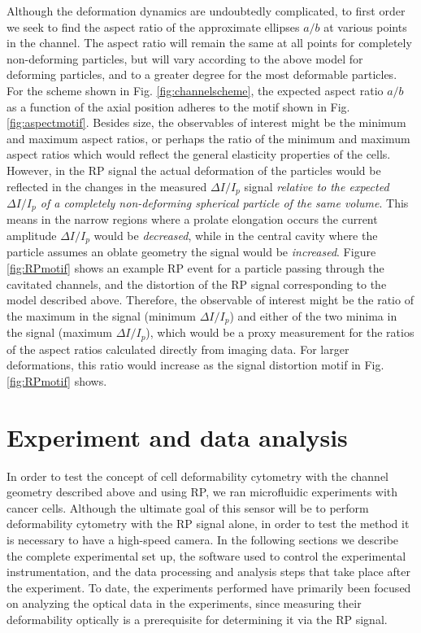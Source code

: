 		Although the deformation dynamics are undoubtedly complicated, to first order we seek to find the aspect ratio of the approximate ellipses $a/b$ at various points in the channel. The aspect ratio will remain the same at all points for completely non-deforming particles, but will vary according to the above model for deforming particles, and to a greater degree for the most deformable particles. For the scheme shown in Fig. \ref{fig:channelscheme}, the expected aspect ratio $a/b$ as a function of the axial position adheres to the motif shown in Fig. \ref{fig:aspectmotif}. Besides size, the observables of interest might be the minimum and maximum aspect ratios, or perhaps the ratio of the minimum and maximum aspect ratios which would reflect the general elasticity properties of the cells. However, in the RP signal the actual deformation of the particles would be reflected in the changes in the measured $\Delta I/I_{p}$ signal \textit{relative to the expected $\Delta I/I_{p}$ of a completely non-deforming spherical particle of the same volume}. This means in the narrow regions where a prolate elongation occurs the current amplitude $\Delta I/I_{p}$ would be \textit{decreased}, while in the central cavity where the particle assumes an oblate geometry the signal would be \textit{increased}. Figure \ref{fig:RPmotif} shows an example RP event for a particle passing through the cavitated channels, and the distortion of the RP signal corresponding to the model described above. Therefore, the observable of interest might be the ratio of the maximum in the signal (minimum $\Delta I/I_{p}$) and either of the two minima in the signal (maximum $\Delta I/I_{p}$), which would be a proxy measurement for the ratios of the aspect ratios calculated directly from imaging data. For larger deformations, this ratio would increase as the signal distortion motif in Fig. \ref{fig:RPmotif} shows.
		
	\section{Experiment and data analysis}

		In order to test the concept of cell deformability cytometry with the channel geometry described above and using RP, we ran microfluidic experiments with cancer cells. Although the ultimate goal of this sensor will be to perform deformability cytometry with the RP signal alone, in order to test the method it is necessary to have a high-speed camera. In the following sections we describe the complete experimental set up, the software used to control the experimental instrumentation, and the data processing and analysis steps that take place after the experiment. To date, the experiments performed have primarily been focused on analyzing the optical data in the experiments, since measuring their deformability optically is a prerequisite for determining it via the RP signal.
	
